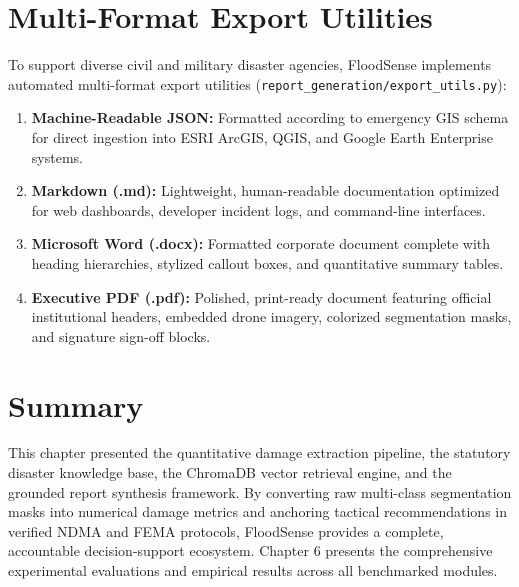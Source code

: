 \section{Multi-Format Export Utilities}
To support diverse civil and military disaster agencies, FloodSense implements automated multi-format export utilities (\texttt{report\_generation/export\_utils.py}):
\begin{enumerate}
    \item \textbf{Machine-Readable JSON:} Formatted according to emergency GIS schema for direct ingestion into ESRI ArcGIS, QGIS, and Google Earth Enterprise systems.
    \item \textbf{Markdown (.md):} Lightweight, human-readable documentation optimized for web dashboards, developer incident logs, and command-line interfaces.
    \item \textbf{Microsoft Word (.docx):} Formatted corporate document complete with heading hierarchies, stylized callout boxes, and quantitative summary tables.
    \item \textbf{Executive PDF (.pdf):} Polished, print-ready document featuring official institutional headers, embedded drone imagery, colorized segmentation masks, and signature sign-off blocks.
\end{enumerate}

\section{Summary}
This chapter presented the quantitative damage extraction pipeline, the statutory disaster knowledge base, the ChromaDB vector retrieval engine, and the grounded report synthesis framework. By converting raw multi-class segmentation masks into numerical damage metrics and anchoring tactical recommendations in verified NDMA and FEMA protocols, FloodSense provides a complete, accountable decision-support ecosystem. Chapter 6 presents the comprehensive experimental evaluations and empirical results across all benchmarked modules.
